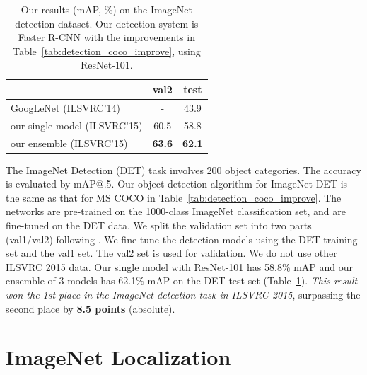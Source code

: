 \documentclass[10pt,twocolumn,letterpaper]{article}
\renewcommand\arraystretch{1.2}
\begin{document}
\renewcommand\arraystretch{1.2}
\setlength{\tabcolsep}{10pt}
\begin{table}[t]
  \begin{center}
    \small
    \begin{tabular}{l|c|c}
      \hline
                                               & val2          & test          \\
      \hline
      GoogLeNet \cite{Szegedy2015} (ILSVRC'14) & -             & 43.9          \\
      \hline
      our single model (ILSVRC'15)             & 60.5          & 58.8          \\
      our ensemble (ILSVRC'15)                 & \textbf{63.6} & \textbf{62.1} \\
      \hline
    \end{tabular}
  \end{center}
  \vspace{-.5em}
  \caption{Our results (mAP, \%) on the ImageNet detection dataset. Our detection system is Faster R-CNN \cite{Ren2015} with the improvements in Table~\ref{tab:detection_coco_improve}, using ResNet-101.
  }
  \vspace{-.5em}
  \label{tab:imagenet_det}
\end{table}

The ImageNet Detection (DET) task involves 200 object categories. The accuracy is evaluated by mAP@.5.
Our object detection algorithm for ImageNet DET is the same as that for MS COCO in Table~\ref{tab:detection_coco_improve}. The networks are pre-trained on the 1000-class ImageNet classification set, and are fine-tuned on the DET data. We split the validation set into two parts (val1/val2) following \cite{Girshick2014}. We fine-tune the detection models using the DET training set and the val1 set. The val2 set is used for validation. We do not use other ILSVRC 2015 data. Our single model with ResNet-101 has 58.8\% mAP and our ensemble of 3 models has 62.1\% mAP on the DET test set (Table~\ref{tab:imagenet_det}). \emph{This result won the 1st place in the ImageNet detection task in ILSVRC 2015}, surpassing the second place by \textbf{8.5 points} (absolute).


\section{ImageNet Localization}
\label{sec:appendix_localization}
\end{document}
